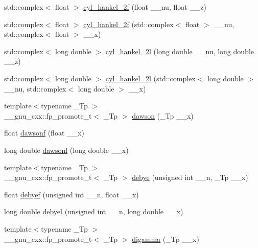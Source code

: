 \begin{DoxyCompactItemize}
\item 
std\+::complex$<$ float $>$ \hyperlink{group__gnu__math__spec__func_ga2b75361870975c47d57bed71b4064ce7}{cyl\+\_\+hankel\+\_\+2f} (float \+\_\+\+\_\+nu, float \+\_\+\+\_\+z)
\item 
std\+::complex$<$ float $>$ \hyperlink{group__gnu__math__spec__func_gae21f9d09b937eaf9729982da5a382f20}{cyl\+\_\+hankel\+\_\+2f} (std\+::complex$<$ float $>$ \+\_\+\+\_\+nu, std\+::complex$<$ float $>$ \+\_\+\+\_\+x)
\item 
std\+::complex$<$ long double $>$ \hyperlink{group__gnu__math__spec__func_ga4babb91ca6906f237e8bd1f0f1a10509}{cyl\+\_\+hankel\+\_\+2l} (long double \+\_\+\+\_\+nu, long double \+\_\+\+\_\+z)
\item 
std\+::complex$<$ long double $>$ \hyperlink{group__gnu__math__spec__func_ga1ac6434925254bd02e108f5a4e52b34d}{cyl\+\_\+hankel\+\_\+2l} (std\+::complex$<$ long double $>$ \+\_\+\+\_\+nu, std\+::complex$<$ long double $>$ \+\_\+\+\_\+x)
\item 
{\footnotesize template$<$typename \+\_\+\+Tp $>$ }\\\+\_\+\+\_\+gnu\+\_\+cxx\+::fp\+\_\+promote\+\_\+t$<$ \+\_\+\+Tp $>$ \hyperlink{group__gnu__math__spec__func_gabc97cbc04fdd23593e8dccbc1421dad5}{dawson} (\+\_\+\+Tp \+\_\+\+\_\+x)
\item 
float \hyperlink{group__gnu__math__spec__func_ga0a1b8e6760b8c7869127d41d96209318}{dawsonf} (float \+\_\+\+\_\+x)
\item 
long double \hyperlink{group__gnu__math__spec__func_ga6647a7444ff9c7c1f2a8ed36761bfeb2}{dawsonl} (long double \+\_\+\+\_\+x)
\item 
{\footnotesize template$<$typename \+\_\+\+Tp $>$ }\\\+\_\+\+\_\+gnu\+\_\+cxx\+::fp\+\_\+promote\+\_\+t$<$ \+\_\+\+Tp $>$ \hyperlink{group__gnu__math__spec__func_ga0b14de47c011de3ebf771c9f29b2b78c}{debye} (unsigned int \+\_\+\+\_\+n, \+\_\+\+Tp \+\_\+\+\_\+x)
\item 
float \hyperlink{group__gnu__math__spec__func_ga683d3a885913b52db128aa5d624984a4}{debyef} (unsigned int \+\_\+\+\_\+n, float \+\_\+\+\_\+x)
\item 
long double \hyperlink{group__gnu__math__spec__func_ga2db11e767b89bbd36be6ebfadda3401f}{debyel} (unsigned int \+\_\+\+\_\+n, long double \+\_\+\+\_\+x)
\item 
{\footnotesize template$<$typename \+\_\+\+Tp $>$ }\\\+\_\+\+\_\+gnu\+\_\+cxx\+::fp\+\_\+promote\+\_\+t$<$ \+\_\+\+Tp $>$ \hyperlink{group__gnu__math__spec__func_ga7b87300edf8754d959e1d94fe0c9246e}{digamma} (\+\_\+\+Tp \+\_\+\+\_\+x)

\end{DoxyCompactItemize}
